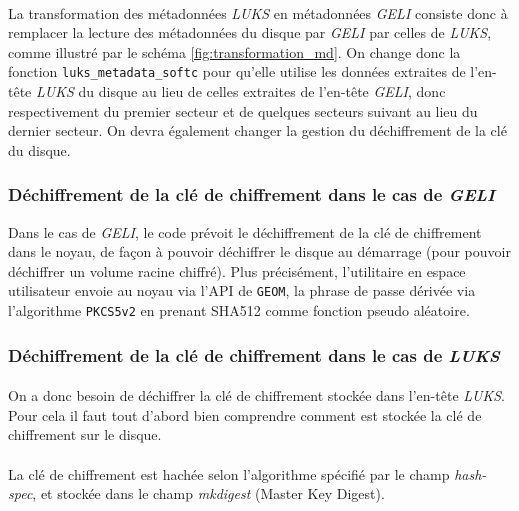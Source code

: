 \paragraph{}
La transformation des métadonnées \textit{LUKS} en métadonnées \textit{GELI}
consiste donc à remplacer la lecture des métadonnées du disque par \textit{GELI}
par celles de \textit{LUKS}, comme illustré par le schéma
\ref{fig:transformation_md}. On change donc la fonction
\texttt{luks\_metadata\_softc} pour qu'elle utilise les données extraites de
l'en-tête \textit{LUKS} du disque au lieu de celles extraites de l'en-tête
\textit{GELI}, donc respectivement du premier secteur et de quelques secteurs
suivant au lieu du dernier secteur. On devra également changer la gestion du
déchiffrement de la clé du disque.


\subsubsection{Déchiffrement de la clé de chiffrement dans le cas de
  \textit{GELI}}
Dans le cas de \textit{GELI}, le code prévoit le déchiffrement de la clé de
chiffrement dans le noyau, de façon à pouvoir déchiffrer le disque au démarrage
(pour pouvoir déchiffrer un volume racine chiffré). Plus précisément,
l'utilitaire en espace utilisateur envoie au noyau via l'API de \texttt{GEOM},
la phrase de passe dérivée via l'algorithme \texttt{PKCS5v2} en prenant SHA512
comme fonction pseudo aléatoire.


\subsubsection{Déchiffrement de la clé de chiffrement dans le cas de
  \textit{LUKS}}
\label{sub:dechif_cle}
\paragraph{}
On a donc besoin de déchiffrer la clé de chiffrement stockée dans l'en-tête
{\em LUKS}. Pour cela il faut tout d'abord bien comprendre comment est stockée
la clé de chiffrement sur le disque.

\paragraph{}
La clé de chiffrement est hachée selon l'algorithme spécifié par le champ
{\em hash-spec}, et stockée dans le champ {\em mkdigest} (Master Key Digest).

